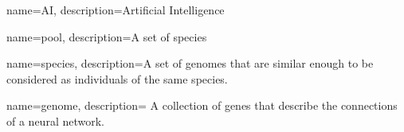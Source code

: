
{
    name=AI,
    description={Artificial Intelligence}
}

{
    name=pool,
    description={A set of species}
}

{
    name=species,
    description={A set of genomes that are similar enough to be considered as individuals of the same species.}
}

{
    name=genome,
    description={ A collection of genes that describe the connections of a neural network. }
}


\glsaddall
\clearpage
\printglossary[title=Vocabulary, toctitle=Vocabulary]
